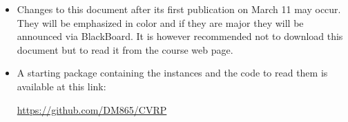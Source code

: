 \documentclass[a4paper,10pt]{article}
\begin{document}
\begin{itemize}
\item Changes to this document after its first publication on March 11
  may occur. They will be emphasized in color and if they are major they
  will be announced via BlackBoard. It is however recommended not to
  download this document but to read it from the course web page.


\item A starting package containing the instances and the code to read
  them is available at this link:
\begin{center}
\url{https://github.com/DM865/CVRP}
\end{center}


\end{itemize}









\end{document}
